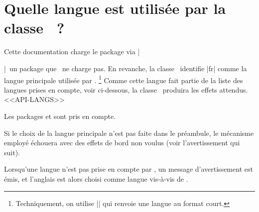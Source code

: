 \documentclass{main}
\begin{document}
\section{Quelle langue est utilisée par la classe \thisproj\ ?}

Cette documentation charge le package  via \tdoclatexin|\usepackage[english]{babel}|\, un package que \thisproj\ ne charge pas.
En revanche, la classe \thisproj\ identifie \tdoclatexin|fr| comme la langue principale utilisée par .%
\footnote{
    Techniquement, on utilise \tdoclatexin|| qui renvoie une langue au format court.
}
Comme cette langue fait partie de la liste des langues prises en compte, voir ci-dessous, la classe \thisproj\ produira les effets attendus.
<<API-LANGS>>


\begin{tdocnote}
    Les packages  et  sont pris en compte.
\end{tdocnote}


\begin{tdoccaut}
    Si le choix de la langue principale n'est pas faite dans le préambule, le mécanisme employé échouera avec des effets de bord non voulus (voir l'avertissement qui suit).
\end{tdoccaut}


\begin{tdocwarn}
    Lorsqu'une langue n'est pas prise en compte par \thisproj, un message d'avertissement est émis, et l'anglais est alors choisi comme langue vis-à-vis de \thisproj.
\end{tdocwarn}
\end{document}
